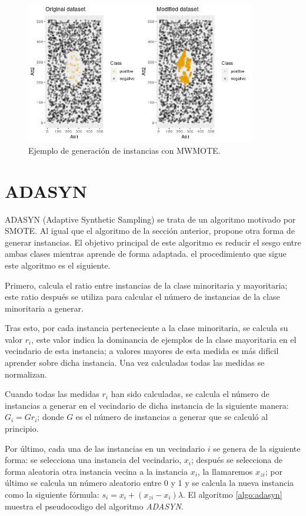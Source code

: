 \begin{figure}[H]
	\centering
	\includegraphics[width=100mm]{imagenes/MWMOTE_comparison.png}
	\caption{Ejemplo de generación de instancias con MWMOTE.}
	\label{fig:42}
\end{figure}
\verticalspace

\section{ADASYN}
ADASYN (Adaptive Synthetic Sampling) \cite{he2008adasyn} se trata de un algoritmo motivado por SMOTE. Al igual que el algoritmo de la sección anterior, propone otra forma de generar instancias. El objetivo principal de este algoritmo es reducir el sesgo entre ambas clases mientras aprende de forma adaptada. el procedimiento que sigue este algoritmo es el siguiente.\newline

Primero, calcula el ratio entre instancias de la clase minoritaria y mayoritaria; este ratio después se utiliza para calcular el número de instancias de la clase minoritaria a generar.\newline

Tras esto, por cada instancia perteneciente a la clase minoritaria, se calcula su valor $r_i$, este valor indica la dominancia de ejemplos de la clase mayoritaria en el vecindario de esta instancia; a valores mayores de esta medida es más difícil aprender sobre dicha instancia. Una vez calculadas todas las medidas se normalizan.\newline

Cuando todas las medidas $r_i$ han sido calculadas, se calcula el número de instancias a generar en el vecindario de dicha instancia de la siguiente manera: $G_i = G r_i$; donde $G$ es el número de instancias a generar que se calculó al principio.\newline
\newpage

Por último, cada una de las instancias en un vecindario $i$ se genera de la siguiente forma: se selecciona una instancia del vecindario, $x_i$; después se selecciona de forma aleatoria otra instancia vecina a la instancia $x_i$, la llamaremos $x_{zi}$; por último se calcula un número aleatorio entre 0 y 1 y se calcula la nueva instancia como la siguiente fórmula: $ s_i = x_i + (x_{zi}-x_i)\lambda$. El algoritmo \ref{algo:adasyn} muestra el pseudocodigo del algoritmo \textit{ADASYN}.

